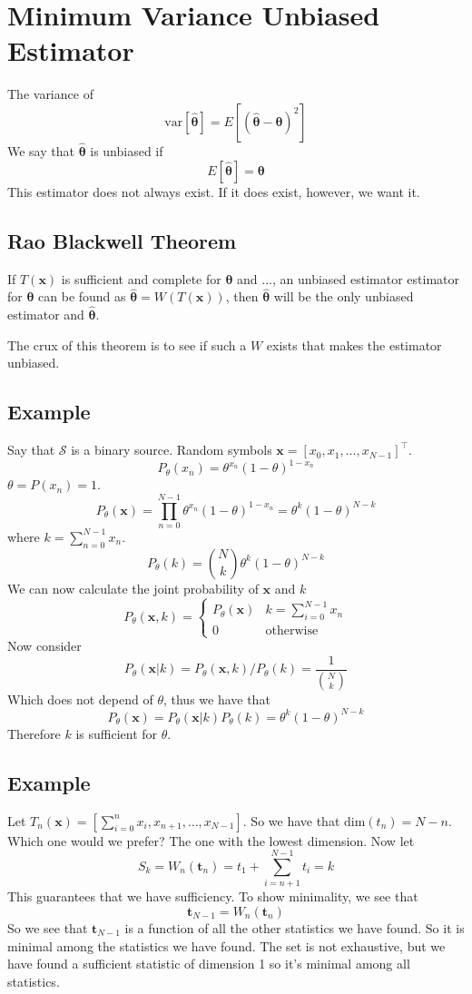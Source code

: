 \documentclass[a4paper]{article}
\begin{document}
\section*{Minimum Variance Unbiased Estimator}%
The variance of
\[
  \text{var} \left[ \hat{\bm{\theta}} \right] = E \left[ \left( \hat{\bm{\theta}} - \bm{\theta} \right)^2 \right]
\]
We say that $\hat{\bm{\theta}}$ is unbiased if 
\[
  E \left[ \hat{\bm{\theta}} \right] = \bm{\theta}
\]
This estimator does not always exist. If it does exist, however, we want it.

\subsection*{Rao Blackwell Theorem}%
If $T(\mathbf{x})$ is sufficient and complete for $\bm{\theta}$ and ..., an unbiased estimator estimator for $\bm{\theta}$ can be found as $\hat{\bm{\theta}} = W(T(\bm{x}))$, then $\hat{\bm{\theta}}$ will be the only unbiased estimator and $\hat{\bm{\theta}}$. 

The crux of this theorem is to see if such a $W$ exists that makes the estimator unbiased.

\subsection*{Example}%
Say that $\mathcal{S}$ is a binary source. Random symbols $\mathbf{x} = [x_0, x_1, \dots, x_{N-1}]^\top$.
\[
  P_{\theta}(x_n) = \theta^{x_n}(1 - \theta)^{1-x_n}
\]
$\theta = P(x_n) = 1$. 
\[
  P_{\theta}(\mathbf{x}) = \prod_{n=0}^{N-1} \theta^{x_n}(1 - \theta)^{1- x_n} = \theta^k(1-\theta)^{N-k}
\]
where $k = \sum_{n=0}^{N-1}x_n$.
\[
  P_{\theta}(k) =  {N \choose k} \theta^k(1-\theta)^{N-k}
\]
We can now calculate the joint probability of $\mathbf{x}$ and $k$
\[
  P_{\theta}(\mathbf{x}, k) =
  \begin{cases}
    P_{\theta}(\mathbf{x}) & k=\sum_{i=0}^{N-1}x_n \\
    0 & \text{otherwise}
    
  \end{cases}
\]
Now consider 
\[
P_{\theta}(\mathbf{x} | k) = P_{\theta}(\mathbf{x}, k)/P_{\theta}(k)
= \frac{1}{{N \choose k}}
\]
Which does not depend of $\theta$, thus we have that
\[
  P_{\theta}(\mathbf{x}) = P_{\theta}(\mathbf{x}|k)P_{\theta}(k) = 
  \theta^k(1-\theta)^{N-k}
\]
Therefore $k$ is sufficient for $\theta$.

\subsection*{Example}
Let $T_n(\bm{x}) = [\sum_{i=0}^n x_i, x_{n+1}, \dots, x_{N-1}]$. So we have that $\text{dim}(t_n) = N-n$. Which one would we prefer? The one with the lowest dimension. Now let
\[
  S_k = W_n(\mathbf{t}_n) = t_1 + \sum_{i=n+1}^{N-1} t_i  = k
\]
This guarantees that we have sufficiency. To show minimality, we see that
\[
  \bm{t}_{N-1} = W_n(\mathbf{t}_n)
\]
So we see that $\bm{t}_{N-1}$ is a function of all the other statistics we have found. So it is minimal among the statistics we have found. The set is not exhaustive, but we have found a sufficient statistic of dimension 1 so it's minimal among all statistics. 
\end{document}
